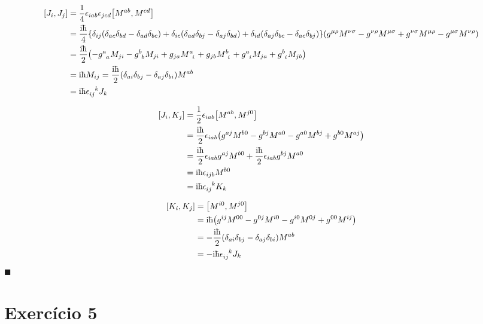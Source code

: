 \documentclass[twoside]{amsart}
\newcommand{\cqd}{\hfill$\blacksquare$}
\numberwithin{equation}{section}
\begin{document}
\begin{align*}
    \comm{J_i}{J_j}&=\frac14\epsilon_{iab}\epsilon_{jcd}\comm{M^{ab}}{M^{cd}}\\
    &=\frac{\im\hbar}{4}\qty{\delta_{ij}\qty(\delta_{ac}\delta_{bd}-\delta_{ad}\delta_{bc})+\delta_{ic}\qty(\delta_{ad}\delta_{bj}-\delta_{aj}\delta_{bd})+\delta_{id}\qty(\delta_{aj}\delta_{bc}-\delta_{ac}\delta_{bj})}\qty(\tensor{g}{^\mu^\rho}\tensor{M}{^\nu^\sigma}-\tensor{g}{^\nu^\rho}\tensor{M}{^\mu^\sigma}+\tensor{g}{^\nu^\sigma}\tensor{M}{^\mu^\rho}-\tensor{g}{^\mu^\sigma}\tensor{M}{^\nu^\rho})\\
    &=\frac{\im\hbar}{2}\qty(-\tensor{g}{^a_a}M_{ji}-\tensor{g}{^b_b}M_{ji}+g_{ja}\tensor{M}{^a_i}+g_{jb}\tensor{M}{^b_i}+\tensor{g}{^a_i}M_{ja}+\tensor{g}{^b_i}M_{jb})\\
    &=\im\hbar M_{ij}=\frac{\im\hbar}{2}\qty(\delta_{ai}\delta_{bj}-\delta_{aj}\delta_{bi})M^{ab}\\
    &=\im\hbar\tensor{\epsilon}{_i_j^k}J_k
\end{align*}

\begin{align*}
    \comm{J_i}{K_j}&=\frac12\epsilon_{iab}\comm{M^{ab}}{M^{j0}}\\
    &=\frac{\im\hbar}{2}\epsilon_{iab}\qty(g^{aj}M^{b0}-g^{bj}M^{a0}-g^{a0}M^{bj}+g^{b0}M^{aj})\\
    &=\frac{\im\hbar}{2}\epsilon_{iab}g^{aj}M^{b0}+\frac{\im\hbar}{2}\epsilon_{iab}g^{bj}M^{a0}\\
    &=\im\hbar\epsilon_{ijb}M^{b0}\\
    &=\im\hbar\tensor{\epsilon}{_i_j^k}K_k
\end{align*}

\begin{align*}
    \comm{K_i}{K_j}&=\comm{M^{i0}}{M^{j0}}\\
    &=\im\hbar\qty(g^{ij}M^{00}-g^{0j}M^{i0}-g^{i0}M^{0j}+g^{00}M^{ij})\\
    &=-\frac{\im\hbar}{2}\qty(\delta_{ai}\delta_{bj}-\delta_{aj}\delta_{bi})M^{ab}\\
    &=-\im\hbar\tensor{\epsilon}{_i_j^k}J_k
\end{align*}
\cqd


\section{Exercício 5}
\end{document}
